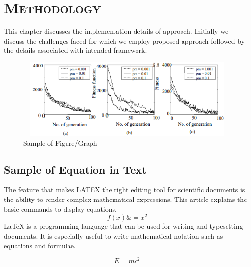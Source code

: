 \chapter{\textsc{Methodology}}

This chapter discusses the implementation details of approach. Initially we discuss the challenges faced for which we employ proposed approach followed by the details associated with intended framework. 

\vskip 0.5in

\begin{figure}[ht!]
         \centering
         \includegraphics[width=14.0cm, height=4.0cm]{Extras/fig1.png}
         \caption{Sample of Figure/Graph}
         \label{fig:1}
\end{figure}

\section{Sample of Equation in Text}
The feature that makes LATEX the right editing tool for scientific documents is the ability to render complex mathematical expressions. This article explains the basic commands to display equations.
\begin{equation}
  f(x) \&= x^2
\end{equation}
LaTeX is a programming language that can be used for writing and typesetting documents. It is especially useful to write mathematical notation such as equations and formulae.

\begin{equation}
 E= mc^2
\end{equation}